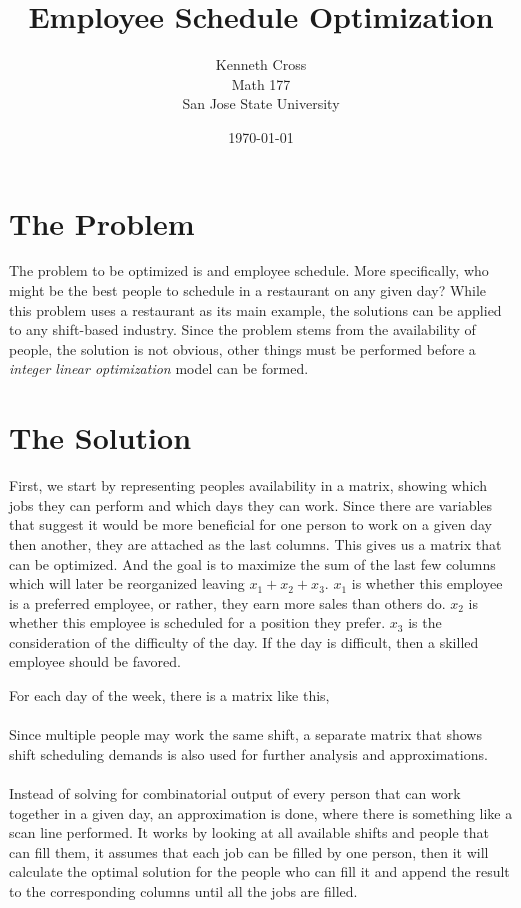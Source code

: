 \documentclass[letter,11pt]{article}
\author{Kenneth Cross \\
        Math 177 \\
        San Jose State University}
\title{\textbf{Employee Schedule Optimization}}
\date{\today}
\begin{document}
\maketitle
\newpage

\section{The Problem}

The problem to be optimized is and employee schedule. 
More specifically, who might be the best people to schedule in a restaurant on any given day?
While this problem uses a restaurant as its main example, the solutions can be applied to any shift-based industry.
Since the problem stems from the availability of people, the solution is not obvious, other things must be performed before a \emph{integer linear optimization} model can be formed.

\section{The Solution}

First, we start by representing peoples availability in a matrix, showing which jobs they can perform and which days they can work.
Since there are variables that suggest it would be more beneficial for one person to work on a given day then another, they are attached as the last columns.
This gives us a matrix that can be optimized.
And the goal is to maximize the sum of the last few columns which will later be reorganized leaving $x_1 + x_2 + x_3$.
$x_1$ is whether this employee is a preferred employee, or rather, they earn more sales than others do.
$x_2$ is whether this employee is scheduled for a position they prefer.
$x_3$ is the consideration of the difficulty of the day.
If the day is difficult, then a skilled employee should be favored.

For each day of the week, there is a matrix like this, \\ 

\\
Since multiple people may work the same shift, a separate matrix that shows shift scheduling demands is also used for further analysis and approximations. \\

\\
Instead of solving for combinatorial output of every person that can work together in a given day, an approximation is done, where there is something like a scan line performed.
It works by looking at all available shifts and people that can fill them, it assumes that each job can be filled by one person, then it will calculate the optimal solution for the people who can fill it and append the result to the corresponding columns until all the jobs are filled.
\end{document}
